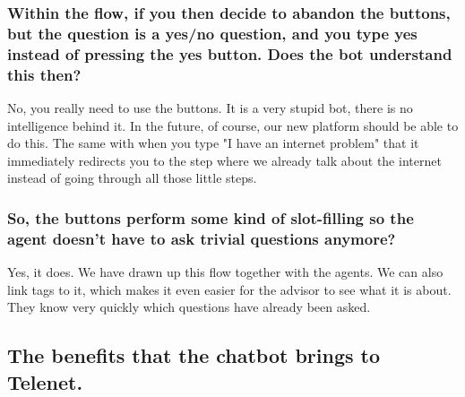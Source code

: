 \begin{appendices}
	\subsubsection{Within the flow, if you then decide to abandon the buttons, but the question is a yes/no question, and you type yes instead of pressing the yes button. Does the bot understand this then?}
	No, you really need to use the buttons. It is a very stupid bot, there is no intelligence behind it. In the future, of course, our new platform should be able to do this. The same with when you type "I have an internet problem" that it immediately redirects you to the step where we already talk about the internet instead of going through all those little steps.
	
	\subsubsection{So, the buttons perform some kind of slot-filling so the agent doesn't have to ask trivial questions anymore?}
	Yes, it does. We have drawn up this flow together with the agents. We can also link tags to it, which makes it even easier for the advisor to see what it is about. They know very quickly which questions have already been asked. 
	
	\subsection{The benefits that the chatbot brings to Telenet.}

\end{appendices}
